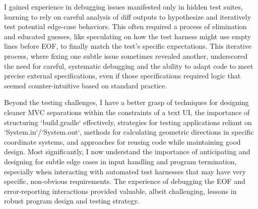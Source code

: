 \documentclass[11pt]{article}
\begin{document}
\begin{enumerate}
    I gained experience in debugging issues manifested only in hidden test suites, learning to rely on careful analysis of diff outputs to hypothesize and iteratively test potential edge-case behaviors. This often required a process of elimination and educated guesses, like speculating on how the test harness might use empty lines before EOF, to finally match the test's specific expectations. This iterative process, where fixing one subtle issue sometimes revealed another, underscored the need for careful, systematic debugging and the ability to adapt code to meet precise external specifications, even if those specifications required logic that seemed counter-intuitive based on standard practice.

    Beyond the testing challenges, I have a better grasp of techniques for designing cleaner MVC separations within the constraints of a text UI, the importance of structuring `build.gradle` effectively, strategies for testing applications reliant on `System.in`/`System.out`, methods for calculating geometric directions in specific coordinate systems, and approaches for reusing code while maintaining good design. Most significantly, I now understand the importance of anticipating and designing for subtle edge cases in input handling and program termination, especially when interacting with automated test harnesses that may have very specific, non-obvious requirements. The experience of debugging the EOF and error-reporting interactions provided valuable, albeit challenging, lessons in robust program design and testing strategy.

\end{enumerate}
\end{document}
